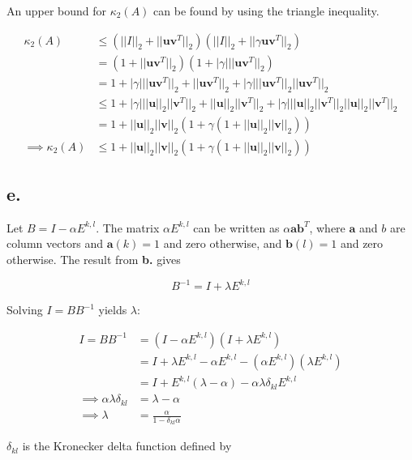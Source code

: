 \documentclass[00-main.tex]{subfiles}
\begin{document}
An upper bound for $\kappa_2(A)$ can be found by using the triangle inequality.

\begin{align*}
\kappa_2(A) & \leq (||I||_2 + ||\mathbf{uv}^T||_2) (||I||_2+||\gamma \mathbf{uv}^T||_2) \\
&= (1 + ||\mathbf{uv}^T||_2) (1 + |\gamma| ||\mathbf{uv}^T||_2) \\
&= 1 + |\gamma| ||\mathbf{uv}^T||_2 + ||\mathbf{uv}^T||_2 + |\gamma| ||\mathbf{uv}^T||_2 ||\mathbf{uv}^T||_2 \\
& \leq 1 + |\gamma| ||\mathbf{u}||_2 ||\mathbf{v}^T||_2 + ||\mathbf{u}||_2 ||\mathbf{v}^T||_2  + |\gamma| ||\mathbf{u}||_2 ||\mathbf{v}^T||_2 ||\mathbf{u}||_2 ||\mathbf{v}^T||_2  \\
&= 1 + ||\mathbf{u}||_2 ||\mathbf{v}||_2 (1 + \gamma(1 + ||\mathbf{u}||_2 ||\mathbf{v}||_2 )) \\
\implies
\kappa_2(A) & \leq 1 + ||\mathbf{u}||_2 ||\mathbf{v}||_2 (1 + \gamma(1 + ||\mathbf{u}||_2 ||\mathbf{v}||_2 ))
\end{align*}

\subsection*{e.}
Let $B = I-\alpha E^{k,l}$. The matrix $\alpha E^{k,l}$ can be written as $\alpha \mathbf{ab}^T$, where $\mathbf{a}$ and $b$ are column vectors and $\mathbf{a}(k) = 1$ and zero otherwise, and $\mathbf{b}(l) = 1$ and zero otherwise. The result from \textbf{b.} gives

\begin{equation}
B^{-1} = I + \lambda E^{k,l}
\end{equation}

Solving $I = BB^{-1}$ yields $\lambda$:

\begin{align*}
I = BB^{-1} &= (I-\alpha E^{k,l}) (I + \lambda E^{k,l}) \\
&= I + \lambda E^{k,l} - \alpha E^{k,l} - (\alpha E^{k,l})(\lambda E^{k,l}) \\
&= I + E^{k,l}(\lambda - \alpha) - \alpha \lambda \delta_{kl} E^{k,l} \\
\implies
\alpha \lambda \delta_{kl} &= \lambda - \alpha \\
\implies
\lambda &= \frac{\alpha}{1 - \delta_{kl} \alpha}  
\end{align*}

$\delta_{kl}$ is the Kronecker delta function defined by
\end{document}
